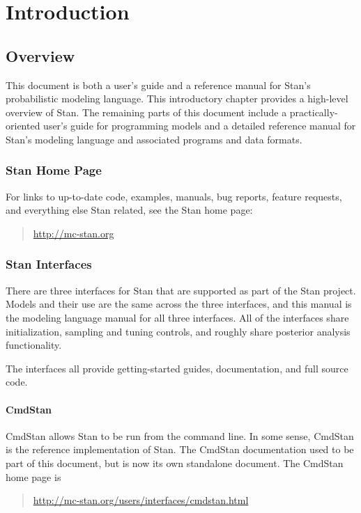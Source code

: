 \part{Introduction}


\chapter{Overview}

\noindent
This document is both a user's guide and a reference manual for
Stan's probabilistic modeling language.  This introductory chapter
provides a high-level overview of Stan. The remaining
parts of this document include a practically-oriented user's guide for
programming models and a detailed reference manual for Stan's
modeling language and associated programs and data formats.

\section{Stan Home Page}

For links to up-to-date code, examples, manuals, bug reports,
feature requests, and everything else Stan related, see
the Stan home page:
%
\begin{quote}
\url{http://mc-stan.org}
\end{quote}


\section{Stan Interfaces}

There are three interfaces for Stan that are supported as part of the
Stan project.  Models and their use are the same across the three
interfaces, and this manual is the modeling language manual for all
three interfaces.  All of the interfaces share initialization,
sampling and tuning controls, and roughly share posterior analysis
functionality.

The interfaces all provide getting-started guides, documentation, and
full source code.

\subsection{CmdStan}

CmdStan allows Stan to be run from the command line.  In some sense,
CmdStan is the reference implementation of Stan.  The CmdStan
documentation used to be part of this document, but is now its own
standalone document.  The CmdStan home page is
%
\begin{quote}
\url{http://mc-stan.org/users/interfaces/cmdstan.html}
\end{quote}

